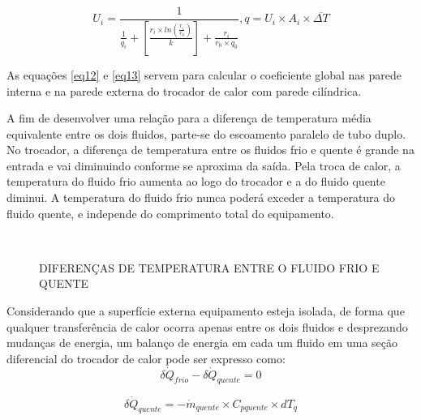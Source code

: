 \documentclass[a4paper,12pt,oneside]{article}
\begin{document}
\begin{flushright}
\begin{equation}\label{eq13}
	U_{i} = \frac{1}{\frac{1}{q_{i}} + \left[ \frac{r_{i} \times ln(\frac{r_{i}}{r_{0}})}{k}\right] + \frac{r_{i}}{r_{0} \times q_{0}} }, q = U_{i} \times A_{i} \times \overline{\Delta T}
\end{equation}
\vspace{0.5cm}

As equações \ref{eq12} e \ref{eq13} servem para calcular o coeficiente global nas parede interna e na parede externa do trocador de calor com parede cilíndrica.

A fim de desenvolver uma relação para a diferença de temperatura média equivalente entre os dois fluidos, parte-se do escoamento paralelo de tubo duplo. No trocador, a diferença de temperatura entre os fluidos frio e quente é grande na entrada e vai diminuindo conforme se aproxima da saída. Pela troca de calor, a temperatura do fluido frio aumenta ao logo do trocador e a do fluido quente diminui. A temperatura do fluido frio nunca poderá exceder a temperatura do fluido quente, e independe do comprimento total do equipamento.
\pagebreak
\clearpage
\newpage

\begin{figure}[h]
	
	\caption{DIFERENÇAS DE TEMPERATURA ENTRE O FLUIDO FRIO E QUENTE}
	\vspace{0.5cm}
	\vspace{0.5cm}\\
\end{figure}
\vspace{0.5cm}

Considerando que a superfície externa equipamento esteja isolada, de forma que qualquer transferência de calor ocorra apenas entre os dois fluidos e desprezando mudanças de energia, um balanço  de energia em cada um fluido em uma seção diferencial do trocador de calor pode ser expresso como:\\

\begin{equation}\label{eq14}
 \delta \dot{Q}_{frio} - \delta \dot{Q}_{quente}  = 0
\end{equation}
\vspace{0.5cm}

\begin{equation}\label{eq15}
\delta \dot{Q}_{quente} = -\dot{m}_{quente} \times C_{pquente} \times dT_{q}
\end{equation}
\vspace{0.5cm}


\end{flushright}
\end{document}

